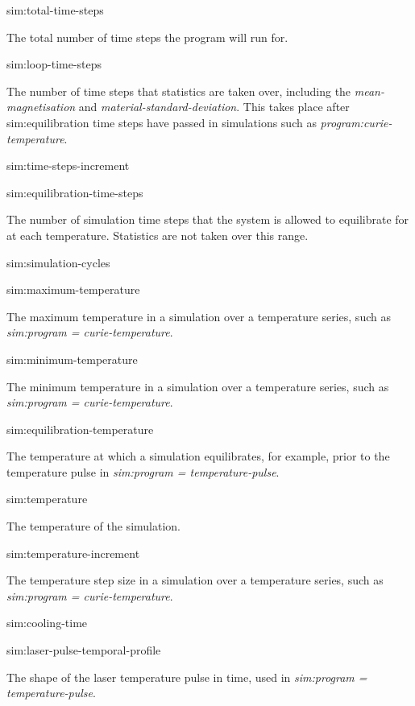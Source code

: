 {\zicf sim:total-time-steps} The total number of time steps the program will run for.

{\zicf sim:loop-time-steps} The number of time steps that statistics are taken over, including the \textit{mean-magnetisation} and \textit{material-standard-deviation}. This takes place after sim:equilibration time steps have passed in simulations such as \textit{program:curie-temperature}.

{\zicf sim:time-steps-increment}

{\zicf sim:equilibration-time-steps} The number of simulation time steps that the system is allowed to equilibrate for at each temperature. Statistics are not taken over this range.

{\zicf sim:simulation-cycles}

{\zicf sim:maximum-temperature} The maximum temperature in a simulation over a temperature series, such as \textit{sim:program = curie-temperature}.

{\zicf sim:minimum-temperature} The minimum temperature in a simulation over a temperature series, such as \textit{sim:program = curie-temperature}.

{\zicf sim:equilibration-temperature} The temperature at which a simulation equilibrates, for example, prior to the temperature pulse in \textit{sim:program = temperature-pulse}.

{\zicf sim:temperature} The temperature of the simulation.

{\zicf sim:temperature-increment} The temperature step size in a simulation over a temperature series, such as \textit{sim:program = curie-temperature}.

{\zicf sim:cooling-time}

{\zicf sim:laser-pulse-temporal-profile} The shape of the laser temperature pulse in time, used in \textit{sim:program = temperature-pulse}.

